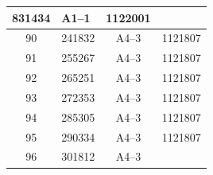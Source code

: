 \documentclass[UTF8,10pt,a4paper,fontset=fandol]{ctexart}
\newcommand{\fieldvalue}[1]{#1}
\begin{document}
\begin{center}
\begin{tabular}{|c|l|c|c|}
\fieldvalue{831434} &
\fieldvalue{A1--1} &
\fieldvalue{1122001}
\\ \hline
\fieldvalue{90} &
\fieldvalue{241832} &
\fieldvalue{A4--3} &
\fieldvalue{1121807}
\\ \hline
\fieldvalue{91} &
\fieldvalue{255267} &
\fieldvalue{A4--3} &
\fieldvalue{1121807}
\\ \hline
\fieldvalue{92} &
\fieldvalue{265251} &
\fieldvalue{A4--3} &
\fieldvalue{1121807}
\\ \hline
\fieldvalue{93} &
\fieldvalue{272353} &
\fieldvalue{A4--3} &
\fieldvalue{1121807}
\\ \hline
\fieldvalue{94} &
\fieldvalue{285305} &
\fieldvalue{A4--3} &
\fieldvalue{1121807}
\\ \hline
\fieldvalue{95} &
\fieldvalue{290334} &
\fieldvalue{A4--3} &
\fieldvalue{1121807}
\\ \hline
\fieldvalue{96} &
\fieldvalue{301812} &
\fieldvalue{A4--3} &

\end{tabular}
\end{center}
\end{document}
